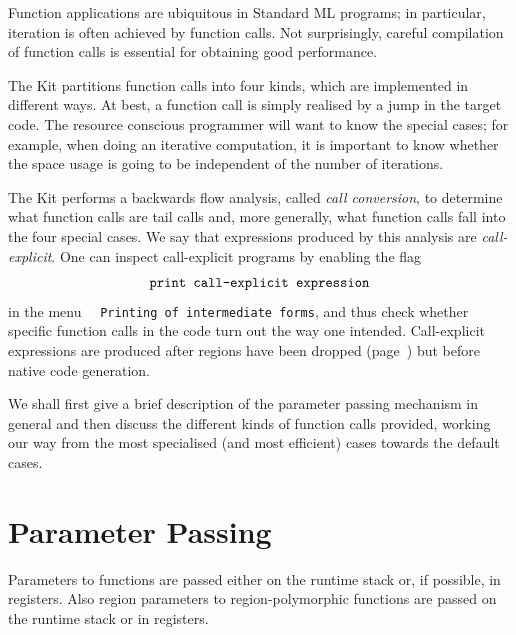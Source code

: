 \documentclass[12pt]{book}
\begin{document}
Function applications are ubiquitous in Standard ML programs; in
particular, iteration is often achieved by function calls. Not
surprisingly, careful compilation of function calls is essential for
obtaining good performance.

The Kit partitions function calls into four kinds, which are
implemented in different ways.  At best, a function call is simply
realised by a jump in the target code.  The resource conscious
programmer will want to know the special cases; for example, when
doing an iterative computation, it is important to know whether the
space usage is going to be independent of the number of iterations.

The Kit performs a backwards flow analysis, called 
%
{\em call conversion}, to determine what function calls are tail calls
and, more generally, what function calls fall into the four special
cases. We say that expressions produced by this analysis are
%
\label{call-explicit}%
{\em call-explicit}. One can inspect call-explicit programs by
enabling the flag
%
$$\hbox{\tt print call-explicit expression}$$
in the menu~~
\texttt{Printing of intermediate forms}, and thus check whether
specific function calls in the code turn out the way one intended.
Call-explicit expressions are produced after regions have been dropped
(page~\pageref{bother-to-distinguish-get-n-put}) but before native
code generation.

We shall first give a brief description of the parameter passing
mechanism in general and then discuss the different kinds of function
calls provided, working our way from the most specialised (and most
efficient) cases towards the default cases.

\section{Parameter Passing}
Parameters to functions are passed either on the runtime
%
stack or, if possible, in
%
registers. Also region parameters to region-polymorphic functions are
passed on the runtime stack or in registers.
\end{document}
